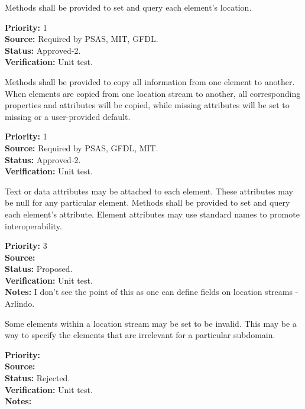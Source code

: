 Methods shall be provided to set and query each element's location.
\begin{reqlist}
{\bf Priority:} 1\\
{\bf Source:} Required by PSAS, MIT, GFDL.\\
{\bf Status:} Approved-2. \\
{\bf Verification:} Unit test.
\end{reqlist}

Methods shall be provided to copy all information from one element to another. 
When elements are copied from one location stream to another, all corresponding
properties and attributes will be copied, while missing attributes will be
set to missing or a user-provided default.
\begin{reqlist}
{\bf Priority:} 1\\
{\bf Source:} Required by PSAS, GFDL, MIT.\\
{\bf Status:} Approved-2. \\
{\bf Verification:} Unit test. 
\end{reqlist}

Text or data attributes may be attached to each element.  These
attributes may be null for any particular element.  Methods shall be provided to set
and query each element's attribute.  Element attributes may use standard names to
promote interoperability.
\begin{reqlist}
{\bf Priority:} 3\\
{\bf Source:} \\
{\bf Status:} Proposed. \\
{\bf Verification:} Unit test. \\
{\bf Notes:} I don't see the point of this as one can define fields on location streams - Arlindo.
\end{reqlist}


Some elements within a location stream may be set to be invalid.  This may be a way
to specify the elements that are irrelevant for a particular subdomain.

\begin{reqlist}
{\bf Priority:} \\
{\bf Source:} \\
{\bf Status:} Rejected. \\
{\bf Verification:} Unit test. \\
{\bf Notes:} 
\end{reqlist}

